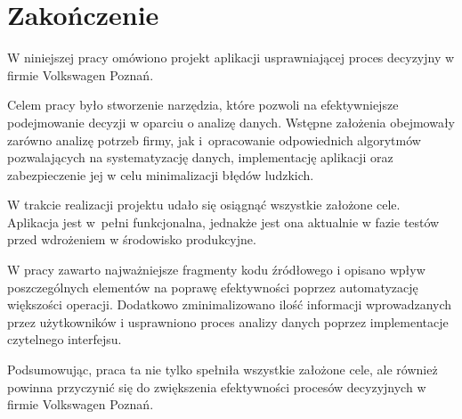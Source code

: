 \chapter{Zakończenie}

W niniejszej pracy omówiono projekt aplikacji usprawniającej proces decyzyjny w firmie Volkswagen Poznań.

Celem pracy było stworzenie narzędzia, które pozwoli na efektywniejsze podejmowanie decyzji w oparciu o analizę danych. Wstępne założenia obejmowały zarówno analizę potrzeb firmy, jak i~opracowanie odpowiednich algorytmów pozwalających na systematyzację danych, implementację aplikacji oraz zabezpieczenie jej w celu minimalizacji błędów ludzkich.

W trakcie realizacji projektu udało się osiągnąć wszystkie założone cele. Aplikacja jest w~pełni funkcjonalna, jednakże jest ona aktualnie w fazie testów przed wdrożeniem w środowisko produkcyjne.

W pracy zawarto najważniejsze fragmenty kodu źródłowego i opisano wpływ poszczególnych elementów na poprawę efektywności poprzez automatyzację większości operacji. Dodatkowo zminimalizowano ilość informacji wprowadzanych przez użytkowników i usprawniono proces analizy danych poprzez implementacje czytelnego interfejsu.

Podsumowując, praca ta nie tylko spełniła wszystkie założone cele, ale również powinna przyczynić się do zwiększenia efektywności procesów decyzyjnych w firmie Volkswagen Poznań.